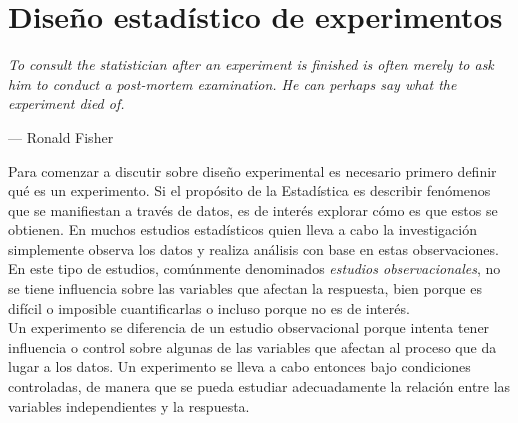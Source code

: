 \chapter{Diseño estadístico de experimentos} \label{chapter:design}

\epigraph{\textit{To consult the statistician after an experiment is finished is often merely to ask him to conduct a post-mortem examination. He can perhaps say what the experiment died of.}}{--- Ronald Fisher}



Para comenzar a discutir sobre diseño experimental es necesario primero definir qué es un experimento. Si el propósito de la Estadística es describir fenómenos que se manifiestan a través de datos, es de interés explorar cómo es que estos se obtienen. En muchos estudios estadísticos quien lleva a cabo la investigación simplemente observa los datos y realiza análisis con base en estas observaciones. En este tipo de estudios, comúnmente denominados \textit{estudios observacionales}, no se tiene influencia sobre las variables que afectan la respuesta, bien porque es difícil o imposible cuantificarlas o incluso porque no es de interés. \\

Un experimento se diferencia de un estudio observacional porque intenta tener influencia o control sobre algunas de las variables que afectan al proceso que da lugar a los datos. Un experimento se lleva a cabo entonces bajo condiciones controladas, de manera que se pueda estudiar adecuadamente la relación entre las variables independientes y la respuesta. \\









